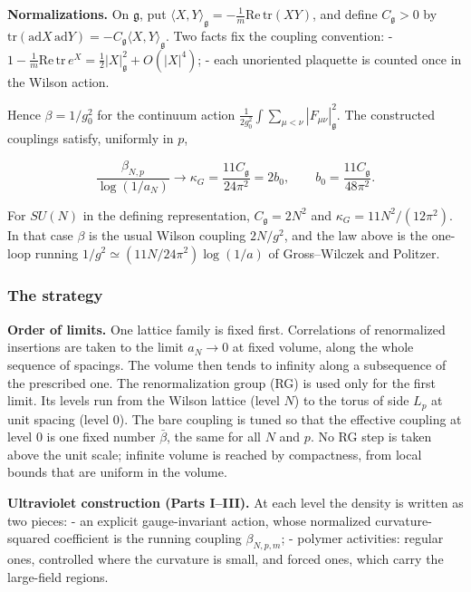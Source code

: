 \documentclass[
  letterpaper,
  11pt]{article}
\begin{document}
\textbf{Normalizations.} On \(\mathfrak g\), put
\(\langle X,Y\rangle_{\mathfrak g}=-\tfrac1m\mathrm{Re}\,\mathrm{tr}(XY)\),
and define \(C_{\mathfrak g}>0\) by
\(\mathrm{tr}(\mathrm{ad}X\,\mathrm{ad}Y)=-C_{\mathfrak g}\langle X,Y\rangle_{\mathfrak g}\).
Two facts fix the coupling convention: -
\(1-\tfrac1m\mathrm{Re}\,\mathrm{tr}\,e^X=\tfrac12|X|_{\mathfrak g}^2+O(|X|^4)\);
- each unoriented plaquette is counted once in the Wilson action.

Hence \(\beta=1/g_0^2\) for the continuum action
\(\frac1{2g_0^2}\int\sum_{\mu<\nu}|F_{\mu\nu}|^2_{\mathfrak g}\). The
constructed couplings satisfy, uniformly in \(p\),

\[\frac{\beta_{N,p}}{\log(1/a_N)}\longrightarrow\kappa_G=\frac{11C_{\mathfrak g}}{24\pi^2}=2b_0,\qquad b_0=\frac{11C_{\mathfrak g}}{48\pi^2}.\]

For \(SU(N)\) in the defining representation, \(C_{\mathfrak g}=2N^2\)
and \(\kappa_G=11N^2/(12\pi^2)\). In that case \(\beta\) is the usual
Wilson coupling \(2N/g^2\), and the law above is the one-loop running
\(1/g^2\simeq(11N/24\pi^2)\log(1/a)\) of Gross--Wilczek and Politzer.

\subsubsection{The strategy}\label{the-strategy}

\textbf{Order of limits.} One lattice family is fixed first.
Correlations of renormalized insertions are taken to the limit
\(a_N\to0\) at fixed volume, along the whole sequence of spacings. The
volume then tends to infinity along a subsequence of the prescribed one.
The renormalization group (RG) is used only for the first limit. Its
levels run from the Wilson lattice (level \(N\)) to the torus of side
\(L_p\) at unit spacing (level \(0\)). The bare coupling is tuned so
that the effective coupling at level \(0\) is one fixed number
\(\bar\beta\), the same for all \(N\) and \(p\). No RG step is taken
above the unit scale; infinite volume is reached by compactness, from
local bounds that are uniform in the volume.

\textbf{Ultraviolet construction (Parts I--III).} At each level the
density is written as two pieces: - an explicit gauge-invariant action,
whose normalized curvature-squared coefficient is the running coupling
\(\beta_{N,p,m}\); - polymer activities: regular ones, controlled where
the curvature is small, and forced ones, which carry the large-field
regions.
\end{document}
